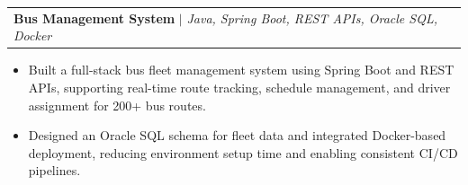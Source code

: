 \documentclass[letterpaper,11pt]{article}
\makeatletter
\newcommand{\resumeItem}[1]{
  \item\small{
    {#1 \vspace{-2pt}}
  }
}
\newcommand{\resumeProjectHeading}[2]{
    \item
    \begin{tabular*}{0.97\textwidth}{l@{\extracolsep{\fill}}r}
      \small#1 & #2 \\
    \end{tabular*}\vspace{-7pt}
}
\newcommand{\resumeItemListStart}{\begin{itemize}[noitemsep, topsep=0pt, parsep=0pt]}
\newcommand{\resumeItemListEnd}{\end{itemize}\vspace{-5pt}}
\makeatother
\begin{document}

  \resumeProjectHeading
    {\textbf{Bus Management System} $|$ \emph{Java, Spring Boot, REST APIs, Oracle SQL, Docker}}{}
    \resumeItemListStart
      \resumeItem{Built a full-stack bus fleet management system using Spring Boot and REST APIs, supporting real-time route tracking, schedule management, and driver assignment for 200+ bus routes.}
      \resumeItem{Designed an Oracle SQL schema for fleet data and integrated Docker-based deployment, reducing environment setup time and enabling consistent CI/CD pipelines.}
    \resumeItemListEnd



\end{document}
